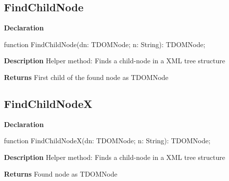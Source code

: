 \documentclass{report}
\newif\ifpdf
\begin{document}
\subsection*{FindChildNode}
\fi
\label{ipkbuild-FindChildNode}
\begin{list}{}{
\setlength{\itemindent}{0cm}
\setlength{\listparindent}{0cm}
\setlength{\leftmargin}{\evensidemargin}
\addtolength{\leftmargin}{\tmplength}
\settowidth{\labelsep}{X}
\addtolength{\leftmargin}{\labelsep}
\setlength{\labelwidth}{\tmplength}
}
\item[\textbf{Declaration}\hfill]
\ifpdf
\begin{flushleft}
\fi
\begin{ttfamily}
function FindChildNode(dn: TDOMNode; n: String): TDOMNode;\end{ttfamily}

\ifpdf
\end{flushleft}
\fi

\par
\item[\textbf{Description}]
Helper method: Finds a child{-}node in a XML tree structure \par
\item[\textbf{Returns}]First child of the found node as TDOMNode


\end{list}
\ifpdf
\subsection*{\large{\textbf{FindChildNodeX}}\normalsize\hspace{1ex}\hrulefill}
\else
\subsection*{FindChildNodeX}
\fi
\label{ipkbuild-FindChildNodeX}
\begin{list}{}{
\setlength{\itemindent}{0cm}
\setlength{\listparindent}{0cm}
\setlength{\leftmargin}{\evensidemargin}
\addtolength{\leftmargin}{\tmplength}
\settowidth{\labelsep}{X}
\addtolength{\leftmargin}{\labelsep}
\setlength{\labelwidth}{\tmplength}
}
\item[\textbf{Declaration}\hfill]
\ifpdf
\begin{flushleft}
\fi
\begin{ttfamily}
function FindChildNodeX(dn: TDOMNode; n: String): TDOMNode;\end{ttfamily}

\ifpdf
\end{flushleft}
\fi

\par
\item[\textbf{Description}]
Helper method: Finds a child{-}node in a XML tree structure \par
\item[\textbf{Returns}]Found node as TDOMNode


\end{list}
\ifpdf
\end{document}
